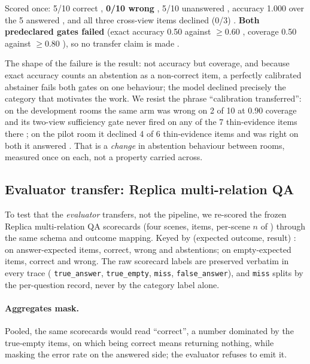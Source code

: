 Scored once: 5/10 correct , \textbf{0/10 wrong} , 5/10 unanswered
, accuracy 1.000 over the 5 answered , and all three cross-view items
declined (0/3) . \textbf{Both predeclared gates failed} (exact accuracy 0.50
against $\ge 0.60$ , coverage 0.50 against $\ge 0.80$ ), so no
transfer claim is made .

The shape of the failure is the result: not accuracy but coverage, and because exact
accuracy counts an abstention as a non-correct item, a perfectly calibrated
abstainer fails both gates on one behaviour; the model declined precisely the category
that motivates the work. We
resist the phrase ``calibration transferred'': on the development rooms the same arm was
wrong on 2 of 10  at 0.90 coverage  and its two-view sufficiency gate
never fired on any of the 7 thin-evidence items there ; on the pilot room it
declined 4 of 6 thin-evidence items and was right on both it answered . That is
a \emph{change} in abstention behaviour between rooms, measured once on each, not a
property carried across.

\subsection{Evaluator transfer: Replica multi-relation QA}
\label{sec:replica}

To test that the \emph{evaluator} transfers, not the pipeline, we re-scored the
frozen Replica multi-relation QA scorecards (four scenes, \SRReplicaTotal{} items,
per-scene $n$ of \SRReplicaSceneNs{} ) through the same schema and outcome
mapping. Keyed by (expected outcome, result) : on answer-expected items,
\SRReplicaAnswerCorrect{} correct, \SRReplicaAnswerWrong{} wrong and
\SRReplicaAnswerAbstain{} abstentions; on empty-expected items,
\SRReplicaEmptyCorrect{} correct and \SRReplicaEmptyWrong{} wrong. The raw scorecard
labels are preserved verbatim in every trace (\SRReplicaTrueAnswer{}
\texttt{true\_answer}, \SRReplicaTrueEmpty{} \texttt{true\_empty}, \SRReplicaMiss{}
\texttt{miss}, \SRReplicaFalseAnswer{} \texttt{false\_answer}), and \texttt{miss}
splits by the per-question record, never by the category label alone.

\paragraph{Aggregates mask.}
Pooled, the same scorecards would read \SRReplicaPooled{} ``correct'', a number
dominated by the \SRReplicaTrueEmpty{} true-empty items, on which being correct means
returning nothing, while masking the error rate on the answered side; the evaluator
refuses to emit it.

